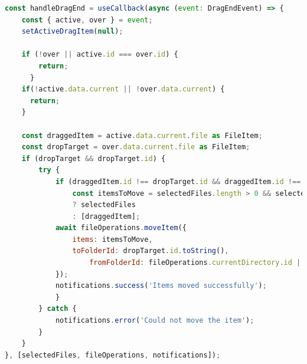 \begin{lstlisting}[language=javascript, caption={Gestió del Drag \& Drop a `FileManager/index.tsx`}]
const handleDragEnd = useCallback(async (event: DragEndEvent) => {
    const { active, over } = event;
    setActiveDragItem(null);
    
    if (!over || active.id === over.id) {
        return;
      }
    if(!active.data.current || !over.data.current) {
      return;
    }
    
    const draggedItem = active.data.current.file as FileItem;
    const dropTarget = over.data.current.file as FileItem;
    if (dropTarget && dropTarget.id) {
        try {
            if (draggedItem.id !== dropTarget.id && draggedItem.id !== dropTarget.parent && dropTarget.type === 'folder') {
                const itemsToMove = selectedFiles.length > 0 && selectedFiles.some(f => f === draggedItem)
                ? selectedFiles
                : [draggedItem];
            await fileOperations.moveItem({
                items: itemsToMove, 
                toFolderId: dropTarget.id.toString(), 
                    fromFolderId: fileOperations.currentDirectory.id || 'root'
            });
            notifications.success('Items moved successfully');
            }
        } catch {
            notifications.error('Could not move the item');
        }
    }
}, [selectedFiles, fileOperations, notifications]);
\end{lstlisting}

